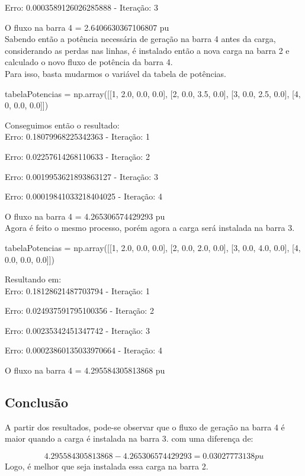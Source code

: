Erro:  0.0003589126026285888  - Iteração:  3

O fluxo na barra  4  =  2.6406630367106807 pu\\

Sabendo então a potência necessária de geração na barra 4 antes da carga, considerando as perdas nas linhas, é instalado então a nova carga na barra 2 e calculado o novo fluxo de potência da barra 4.\\

Para isso, basta mudarmos o variável da tabela de potências.\\

\begin{python}
 tabelaPotencias = np.array([[1, 2.0, 0.0, 0.0],
                            [2, 0.0, 3.5, 0.0],
                            [3, 0.0, 2.5, 0.0],
                            [4, 0, 0.0, 0.0]])   
\end{python}

Conseguimos então o resultado:\\

Erro:  0.18079968225342363  - Iteração:  1

Erro:  0.02257614268110633  - Iteração:  2

Erro:  0.0019953621893863127  - Iteração:  3

Erro:  0.00019841033218404025  - Iteração:  4

O fluxo na barra  4  =  4.265306574429293 pu\\

Agora é feito o mesmo processo, porém agora a carga será instalada na barra 3.

\begin{python}
tabelaPotencias = np.array([[1, 2.0, 0.0, 0.0],
                            [2, 0.0, 2.0, 0.0],
                            [3, 0.0, 4.0, 0.0],
                            [4, 0.0, 0.0, 0.0]])   
\end{python}

Resultando em:\\

Erro:  0.18128621487703794  - Iteração:  1

Erro:  0.024937591795100356  - Iteração:  2

Erro:  0.00235342451347742  - Iteração:  3

Erro:  0.00023860135033970664  - Iteração:  4 

O fluxo na barra  4  =  4.295584305813868 pu\\ 

\subsection{Conclusão}

A partir dos resultados, pode-se observar que o fluxo de geração na barra 4 é maior quando a carga é instalada na barra 3. com uma diferença de:

\[ 4.295584305813868 - 4.265306574429293 = 0.03027773138 pu \]
Logo, é melhor que seja instalada essa carga na barra 2.
